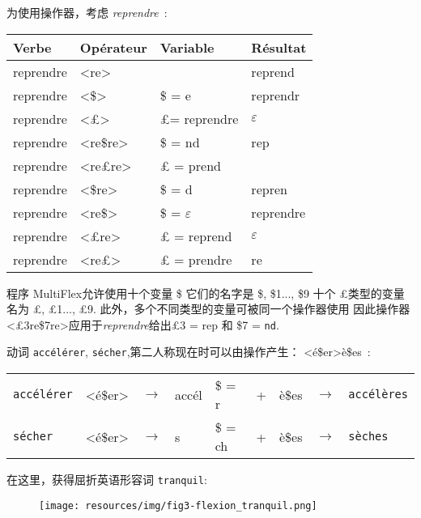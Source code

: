 \noindent
为使用操作器，考虑 {\it reprendre}~:

\bigskip
\begin{center}
\begin{tabular}{|l|l|l|l|}
\hline
Verbe     & Opérateur & Variable & Résultat\\
\hline
\hline
reprendre & <re> & & reprend\\
reprendre & <\$> & \$ = e & reprendr\\
reprendre & <{\pounds}> &{\pounds}= reprendre & $\varepsilon$ \\
reprendre & <re\$re> & \$ = nd & rep\\
reprendre & <re{\pounds}re> & {\pounds} = prend & \\
reprendre & <\$re> & \$ = d & repren\\
reprendre & <re\$> & \$ =  $\varepsilon$ & reprendre\\
reprendre & <{\pounds}re> & {\pounds} = reprend & $\varepsilon$\\
reprendre & <re{\pounds}> & {\pounds} = prendre & re\\
\hline
\end{tabular}
\end{center}

\bigskip
\noindent
程序 MultiFlex允许使用十个变量 \$ 它们的名字是 \$, \$1..., \$9
十个 {\pounds}类型的变量名为 {\pounds}, {\pounds}1..., {\pounds}9. 此外，多个不同类型的变量可被同一个操作器使用
因此操作器 <{\pounds}3re\$7re>应用于{\it reprendre}给出{\pounds}3 = 
 rep 和 \$7 = \verb+nd+.

\bigskip
\noindent
动词 \verb+accélérer+, \verb+sécher+,第二人称现在时可以由操作产生： <é\$er>è\$es~:

\begin{center}
\begin{tabular}{lllllllll}
	\verb+accélérer+ & <é\$er> & $\rightarrow$ & accél & \$ = r & + & è\$es &  $\rightarrow$ & \verb+accélères+\\
	\verb+sécher+ & <é\$er> & $\rightarrow$ & s & \$ = ch & + & è\$es & $\rightarrow$ & \verb+sèches+\\
\end{tabular}
\end{center}


\noindent 在这里，获得屈折英语形容词 \verb+tranquil+:

\bigskip
\begin{figure}[!ht]
\begin{center}
\texttt{[image: resources/img/fig3-flexion\_tranquil.png]}
\end{center}
\end{figure}

